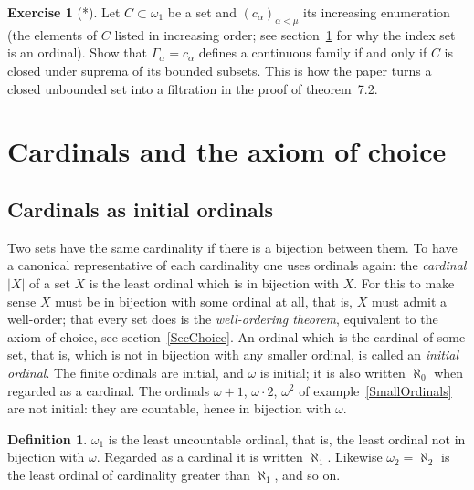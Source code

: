 \documentclass[12pt]{article}
\theoremstyle{definition}
\newtheorem{definition}[theorem]{Definition}
\newtheorem{exercise}[theorem]{Exercise}
\theoremstyle{remark}
\begin{document}
\begin{exercise}[*] Let $C\subset\omega_1$ be a set and
    ${(c_\alpha)}_{\alpha<\mu}$ its increasing enumeration (the elements of
    $C$ listed in increasing order; see section~\ref{SecCardinals} for why
    the index set is an ordinal). Show that $\Gamma_\alpha=c_\alpha$ defines a
    continuous family if and only if $C$ is closed under suprema of its
    bounded subsets. This is how the paper turns a closed unbounded set into
    a filtration in the proof of theorem~7.2.
\end{exercise}

\section{Cardinals and the axiom of choice}\label{SecCardinals}

\subsection{Cardinals as initial ordinals}

Two sets have the same cardinality if there is a bijection between them. To
have a canonical representative of each cardinality one uses ordinals again:
the \emph{cardinal} $|X|$ of a set $X$ is the least ordinal which is in
bijection with $X$. For this to make sense $X$ must be in bijection with some
ordinal at all, that is, $X$ must admit a well-order; that every set does is
the \emph{well-ordering theorem}, equivalent to the axiom of choice, see
section~\ref{SecChoice}. An ordinal which is the cardinal of some set, that
is, which is not in bijection with any smaller ordinal, is called an
\emph{initial ordinal}. The finite ordinals are initial, and $\omega$ is
initial; it is also written $\aleph_0$ when regarded as a cardinal. The
ordinals $\omega+1$, $\omega\cdot 2$, $\omega^2$ of example~\ref{SmallOrdinals}
are not initial: they are countable, hence in bijection with $\omega$.

\begin{definition} $\omega_1$ is the least uncountable ordinal, that is, the
    least ordinal not in bijection with $\omega$. Regarded as a cardinal it
    is written $\aleph_1$. Likewise $\omega_2=\aleph_2$ is the least ordinal
    of cardinality greater than $\aleph_1$, and so on.
\end{definition}
\end{document}
